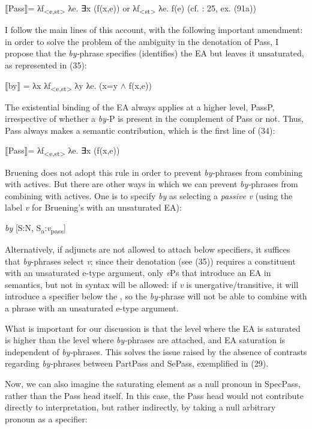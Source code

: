 \documentclass[output=paper]{langsci/langscibook}
\begin{document}
\ea%
    \label{ex:giurgea:34}
    ⟦Pass⟧= λf\textsubscript{<e,st>} λe. ∃x (f(x,e))  or  λf\textsubscript{<st>} λe. f(e)   (cf. \citealt{Bruening2012}: 25, ex. (91a))
\z
    
I follow the main lines of this account, with the following important amendment: in order to solve the problem of the ambiguity in the denotation of Pass, I propose that the \textit{by-}phrase specifies (identifies) the EA but leaves it unsaturated, as represented in (35):

\ea%
    \label{ex:giurgea:35}
    ⟦by⟧ = λx λf\textsubscript{<e,st>} λy λe. (x=y $\wedge$ f(x,e))
\z

The existential binding of the EA always applies at a higher level, PassP, irrespective of whether a \textit{by-}P is present in the complement of Pass or not. Thus, Pass always makes a semantic contribution, which is the first line of (34):

\ea%
    \label{ex:giurgea:36}
⟦Pass⟧= λf\textsubscript{<e,st>} λe. ∃x (f(x,e))
\z


Bruening does not adopt this rule in order to prevent \textit{by-}phrases from combining with actives. But there are other ways in which we can prevent \textit{by-}phrases from combining with actives. One is to specify \textit{by} as selecting a \textit{passive} \textit{v} (using the label \textit{v} for Bruening’s  with an unsaturated EA):

\ea%
    \label{ex:giurgea:37}
    \textit{by} [S:N, S\textsubscript{a}:\textit{v}\textsubscript{pass}]
\z

Alternatively, if adjuncts are not allowed to attach below specifiers, it suffices that \textit{by}{}-phrases select \textit{v}; since their denotation (see (35)) requires a constituent with an unsaturated e-type argument, only \textit{v}Ps that introduce an EA in semantics, but not in syntax will be allowed: if \textit{v} is unergative\slash transitive, it will introduce a specifier below the , so the \textit{by-}phrase will not be able to combine with a phrase with an unsaturated e-type argument.

What is important for our discussion is that the level where the EA is saturated is higher than the level where \textit{by-}phrases are attached, and EA saturation is independent of \textit{by-}phrases. This solves the issue raised by the absence of contrasts regarding \textit{by-}phrases between PartPass and SePass, exemplified in (29). 

Now, we can also imagine the saturating element as a null pronoun in SpecPass, rather than the Pass head itself. In this case, the Pass head would not contribute directly to interpretation, but rather indirectly, by taking a null arbitrary pronoun as a specifier:
\end{document}

